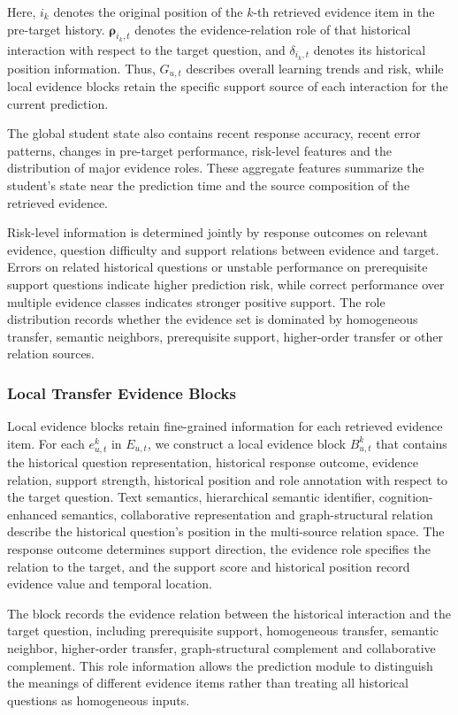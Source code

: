 \documentclass[a4paper,12pt]{article}
\numberwithin{table}{section}
\begin{document}
Here, \(i_k\) denotes the original position of the \(k\)-th retrieved evidence item in the pre-target history. \(\boldsymbol{\rho}_{i_k,t}\) denotes the evidence-relation role of that historical interaction with respect to the target question, and \(\delta_{i_k,t}\) denotes its historical position information. Thus, \(G_{u,t}\) describes overall learning trends and risk, while local evidence blocks retain the specific support source of each interaction for the current prediction.

The global student state also contains recent response accuracy, recent error patterns, changes in pre-target performance, risk-level features and the distribution of major evidence roles. These aggregate features summarize the student's state near the prediction time and the source composition of the retrieved evidence.

Risk-level information is determined jointly by response outcomes on relevant evidence, question difficulty and support relations between evidence and target. Errors on related historical questions or unstable performance on prerequisite support questions indicate higher prediction risk, while correct performance over multiple evidence classes indicates stronger positive support. The role distribution records whether the evidence set is dominated by homogeneous transfer, semantic neighbors, prerequisite support, higher-order transfer or other relation sources.

\subsubsection{Local Transfer Evidence Blocks}

Local evidence blocks retain fine-grained information for each retrieved evidence item. For each \(e_{u,t}^{k}\) in \(E_{u,t}\), we construct a local evidence block \(B_{u,t}^{k}\) that contains the historical question representation, historical response outcome, evidence relation, support strength, historical position and role annotation with respect to the target question. Text semantics, hierarchical semantic identifier, cognition-enhanced semantics, collaborative representation and graph-structural relation describe the historical question's position in the multi-source relation space. The response outcome determines support direction, the evidence role specifies the relation to the target, and the support score and historical position record evidence value and temporal location.

The block records the evidence relation between the historical interaction and the target question, including prerequisite support, homogeneous transfer, semantic neighbor, higher-order transfer, graph-structural complement and collaborative complement. This role information allows the prediction module to distinguish the meanings of different evidence items rather than treating all historical questions as homogeneous inputs.
\end{document}

